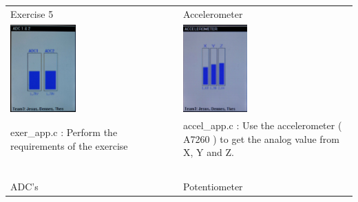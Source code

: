 \begin{tabular}{ p{8cm}  p{8cm} }
  Exercise 5 & Accelerometer  \\
   \includegraphics[width=0.4\textwidth]{adc12.jpg} & \includegraphics[width=0.39\textwidth]{accel.jpg}  \\
  exer\_app.c : Perform the requirements of the exercise & accel\_app.c : Use the accelerometer ( A7260 ) to get the analog value from X, Y and Z. \\
  ~ &~ \\
  ADC's & Potentiometer\\

\end{tabular}
